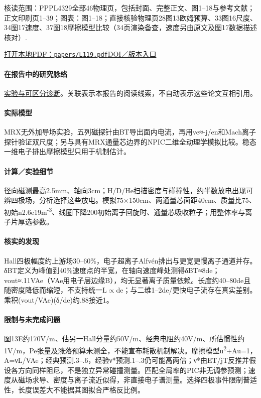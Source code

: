 \documentclass[UTF8,a4paper,11pt,openany,fontset=fandol]{ctexbook}
\begin{document}
\textsf{核读范围：}PPPL4329全部46物理页，包括封面、完整正文、图1–18与参考文献；正文印刷页1–39；\textsf{图表：}图1–18；直接核验物理页28图13欧姆预算、33图16尺度、34图17速度、37图18摩擦模型比较（34页渲染备查，速度另由原文及图17数据描述核对）.

\href{run:../papers/L119.pdf}{打开本地PDF：\texttt{papers/L119.pdf}}\quad\href{https://doi.org/10.1063/1.2936269}{DOI／版本入口}

\paragraph{在报告中的研究脉络}\hyperref[story:diagnostic]{实验与可区分诊断}。关联表示本报告的阅读线索，不自动表示这些论文互相引用。

\paragraph{实际模型}MRX无外加导场实验，五列磁探针由BT导出面内电流，再用ve≈-j/en和Mach离子探针验证双尺度；另与具有MRX通量芯边界的NPIC二维全动理学模拟比较。稳态一维电子排出摩擦模型只用于机制估计。

\paragraph{计算／实验细节}径向磁测最高2.5mm、轴向3cm；H/D/He扫描密度与碰撞性，约半数放电出现可辨四极场，分析选择这些放电。模拟75×150cm、两通量芯面距40cm、质量比75、初始n2.6e19m\textsuperscript{-3}、线圈下降200初始离子回旋时、通量芯吸收粒子；用整体率与离子片厚选参数。

\paragraph{核实的发现}Hall四极幅度约上游场30–60\%，电子超离子Alfvén排出与更宽更慢离子通道并存。δBT定义为峰值到40\%速度点的半宽，在轴向速度峰处测得δBT≈8de；vout≈.11VAe（VAe用电子层边缘B），均无显著离子质量依赖。长度约40–80de且随密度降低而缩短，不支持统一L\ensuremath{\propto}de；与二维1–2de/更快电子流存在真实差别。乘积(vout/VAe)(δ/de)约.88接近1。

\paragraph{限制与未完成问题}图13E约170V/m、估另一Hall分量约50V/m、经典电阻约40V/m、所估惯性约1V/m，Pe张量及涨落预算未测全，不能宣布耗散机制解决。摩擦模型u\textsuperscript{2}+Au=1，A=νL/VAe；经典预测.3–.6，经验ν*预测.1–.3仍可能高两倍；ν*由ET/jT反推并假设各方向同样阻尼，不是独立异常碰撞测量。匹配全局率的PIC非无调参预测；速度从磁场求导、密度与离子流近似得，非直接电子谱测量。选择四极事件限制普适性，长度误差大不能据其图拟合严格反比例。
\end{document}
